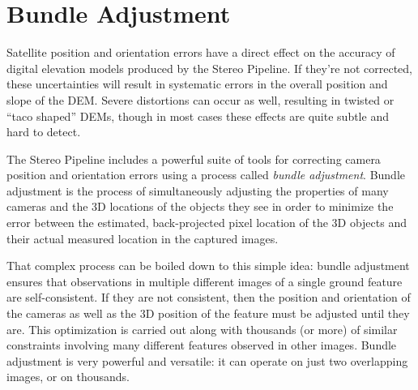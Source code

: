\chapter{Bundle Adjustment}
\label{ch:bundle_adjustment}


Satellite position and orientation errors have a direct effect on the
accuracy of digital elevation models produced by the Stereo Pipeline.
If they're not corrected, these uncertainties will result in
systematic errors in the overall position and slope of the \ac{DEM}.  Severe
distortions can occur as well, resulting in twisted or ``taco shaped''
\acp{DEM}, though in most cases these effects are quite subtle and hard to
detect.

The Stereo Pipeline includes a powerful suite of tools for correcting
camera position and orientation errors using a process called
\emph{bundle adjustment}. Bundle adjustment is the process of
simultaneously adjusting the properties of many cameras and the 3D
locations of the objects they see in order to minimize the error
between the estimated, back-projected pixel location of the 3D
objects and their actual measured location in the captured images.

That complex process can be boiled down to this simple idea: bundle
adjustment ensures that observations in multiple different images of a
single ground feature are self-consistent. If they are not consistent,
then the position and orientation of the cameras as well as the 3D
position of the feature must be adjusted until they are.  This
optimization is carried out along with thousands (or more) of similar
constraints involving many different features observed in other
images.  Bundle adjustment is very powerful and versatile: it can
operate on just two overlapping images, or on thousands.

